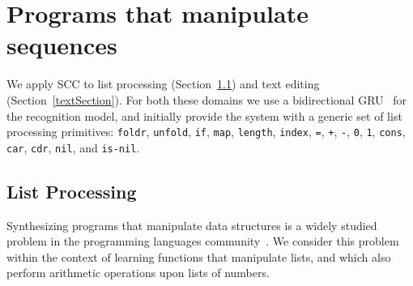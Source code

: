 \documentclass{article}
\newcommand{\system}{\textsc{SCC} }
\newcommand{\code}[1]{{\footnotesize\texttt{#1}}}
\begin{document}


\section{Programs that manipulate sequences}\label{sequences}
We apply \system to list processing (Section~\ref{listSection}) and text editing (Section~\ref{textSection}).
For both these domains we use a bidirectional GRU~\cite{cho2014learning} for
the recognition model, and initially provide the system with a generic set
of list processing primitives:
\code{foldr}, \code{unfold}, \code{if}, \code{map}, \code{length},
\code{index}, \code{=}, \code{+}, \code{-}, \code{0}, \code{1}, \code{cons},
\code{car}, \code{cdr}, \code{nil}, and \code{is-nil}.



\subsection{List Processing}\label{listSection}
Synthesizing programs that manipulate data structures is a widely studied
problem in the programming languages community~\cite{feser2015synthesizing}.
We consider this problem within the context of learning functions that
manipulate lists, and which also perform arithmetic operations upon lists of numbers.
\end{document}
